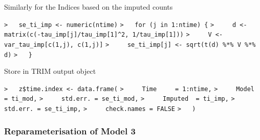 \documentclass[a4paper]{article}
\begin{document}
Similarly for the Indices based on the imputed counts\par
\verb~>   se_ti_imp <- numeric(ntime)~\newline
\verb~>   for (j in 1:ntime) {~\newline
\verb~>     d <- matrix(c(-tau_imp[j]/tau_imp[1]^2, 1/tau_imp[1]))~\newline
\verb~>     V <- var_tau_imp[c(1,j), c(1,j)]~\newline
\verb~>     se_ti_imp[j] <- sqrt(t(d) %*% V %*% d)~\newline
\verb~>   }~\par

Store in TRIM output object\par
\verb~>   z$time.index <- data.frame(~\newline
\verb~>     Time     = 1:ntime,~\newline
\verb~>     Model    = ti_mod,~\newline
\verb~>     std.err. = se_ti_mod,~\newline
\verb~>     Imputed  = ti_imp,~\newline
\verb~>     std.err. = se_ti_imp,~\newline
\verb~>     check.names = FALSE~\newline
\verb~>   )~\par



\subsubsection{Reparameterisation of Model 3}\par
\end{document}
